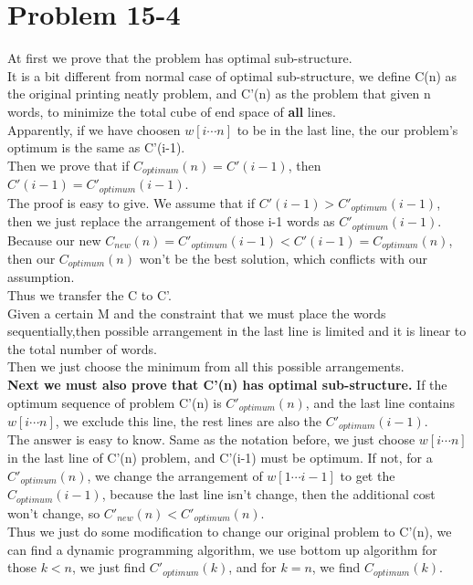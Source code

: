 \documentclass[oneside]{homework} %
\begin{document}
\maketitle
\newpage
\section {Problem 15-4} 
At first we prove that the problem has optimal sub-structure. 
\\It is a bit different from normal case of optimal sub-structure, we define C(n) as the original printing neatly problem, and C'(n) as the problem that given n words, to minimize the total cube of end space of \textbf{all} lines.
\\Apparently, if we have choosen $w[i \cdots n]$ to be in the last line, the our problem's optimum is the same as C'(i-1).\\
Then we prove that if $C_{optimum}(n) = C'(i-1)$, then $C'(i-1) = C'_{optimum}(i-1)$.\\
The proof is easy to give. We assume that if $C'(i-1) > C'_{optimum}(i-1)$, then we just replace the arrangement of those i-1 words as $C'_{optimum}(i-1)$. \\
Because our new $C_{new}(n) = C'_{optimum}(i-1) < C'(i-1) = C_{optimum}(n) $, then our $C_{optimum}(n)$ won't be the best solution, which conflicts with our assumption. \\
Thus we transfer the C to C'. \\
Given a certain M and the constraint that we must place the words sequentially,then possible arrangement in the last line is limited and it is linear to the total number of words.\\Then we just choose the minimum from all this possible arrangements.\\ 
\textbf{Next we must also prove that C'(n) has optimal sub-structure.} 
If the optimum sequence of problem C'(n) is $C'_{optimum}(n)$, and the last line contains $w[i \cdots n]$, we exclude this line, the rest lines are also the $C'_{optimum}(i-1)$.
\\The answer is easy to know. Same as the notation before, we just choose $w[i \cdots n]$ in the last line of C'(n) problem, and C'(i-1) must be optimum. If not, for a $C'_{optimum}(n)$, we change the arrangement of $w[1 \cdots i-1]$ to get the $C_{optimum}(i-1)$, because the last line isn't change, then the additional cost won't change, so $C'_{new}(n) < C'_{optimum}(n)$.\\
Thus we just do some modification to change our original problem to C'(n), we can find a dynamic programming algorithm, we use bottom up algorithm for those $k<n$, we just find $C'_{optimum}(k)$, and for $k=n$, we find $C_{optimum}(k)$. 
\end{document}
